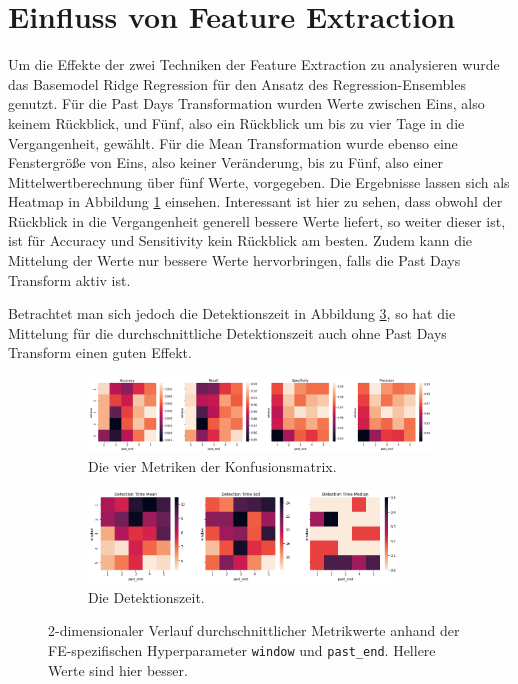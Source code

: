 \section{Einfluss von Feature Extraction}

Um die Effekte der zwei Techniken der Feature Extraction zu analysieren wurde das Basemodel Ridge Regression
 für den Ansatz des Regression-Ensembles genutzt. Für die Past Days Transformation wurden Werte zwischen Eins,
 also keinem Rückblick, und Fünf, also ein Rückblick um bis zu vier Tage in die Vergangenheit, gewählt. Für
 die Mean Transformation wurde ebenso eine Fenstergröße von Eins, also keiner Veränderung, bis zu Fünf, also
 einer Mittelwertberechnung über fünf Werte, vorgegeben. Die Ergebnisse lassen sich als Heatmap in
 Abbildung \ref{fig:res-fe-metrics} einsehen. Interessant ist hier zu sehen, dass obwohl der Rückblick in die Vergangenheit generell
 bessere Werte liefert, so weiter dieser ist, ist für Accuracy und Sensitivity kein Rückblick am besten. Zudem
 kann die Mittelung der Werte nur bessere Werte hervorbringen, falls die Past Days Transform aktiv ist.

Betrachtet man sich jedoch die Detektionszeit in Abbildung \ref{fig:res-fe-dt}, so hat die Mittelung für die
 durchschnittliche Detektionszeit auch ohne Past Days Transform einen guten Effekt.

 \begin{figure}
    \centering
    \begin{adjustwidth}{-1cm}{}
        \begin{subfigure}{\textwidth}
            \includegraphics[width=1.3\textwidth]{res/res-fe-metrics}
            \caption{Die vier Metriken der Konfusionsmatrix.\vspace{1em}}
            \label{fig:res-fe-metrics}
        \end{subfigure}
        \begin{subfigure}{\textwidth}
            \includegraphics[width=0.9\textwidth]{res/res-fe-dt}
            \caption{Die Detektionszeit.}
            \label{fig:res-fe-dt}
        \end{subfigure}
        \caption{2-dimensionaler Verlauf durchschnittlicher Metrikwerte anhand der FE-spezifischen
            Hyperparameter \texttt{window} und \texttt{past\_end}. Hellere Werte sind hier besser.}
    \end{adjustwidth}
\end{figure}

